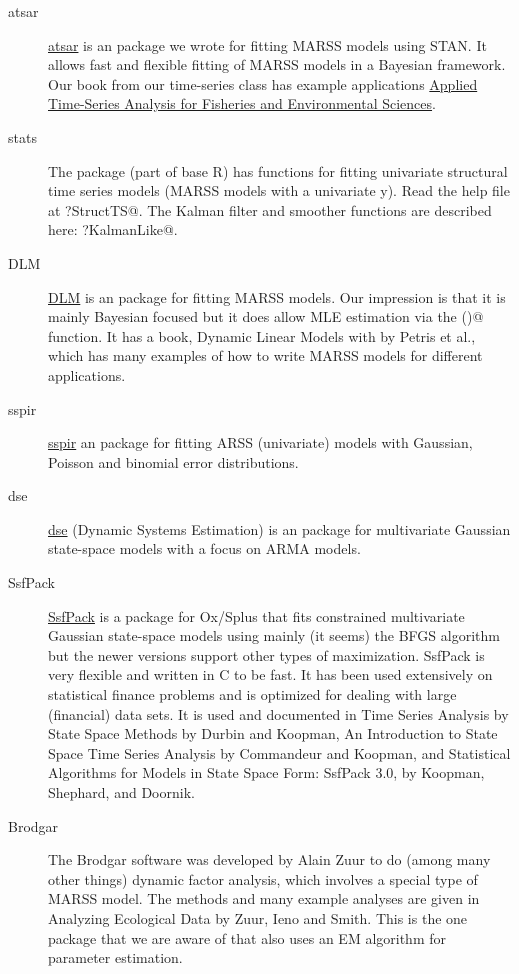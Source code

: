 \begin{description}
	\item[atsar] \href{https://nwfsc-timeseries.github.io/atsar/}{atsar} is an \R package we wrote for fitting MARSS models using STAN.  It allows fast and flexible fitting of MARSS models in a Bayesian framework.  Our book from our time-series class has example applications \href{https://nwfsc-timeseries.github.io/atsa-labs/}{Applied Time-Series Analysis for Fisheries and Environmental Sciences}.
  \item[stats] The \verb@stats@ package (part of base R) has functions for fitting univariate structural time series models (MARSS models with a univariate y).  Read the help file at \verb@?StructTS@. The Kalman filter and smoother functions are described here: \verb@?KalmanLike@.
	\item[DLM] \href{https://cran.r-project.org/package=dlm}{DLM} is an \R package for fitting MARSS models.  Our impression is that it is mainly Bayesian focused but it does allow MLE estimation via the \verb@optim()@ function.  It has a book, Dynamic Linear Models with \R  by Petris et al., which has many examples of how to write MARSS models for different applications.
	\item[sspir] \href{https://cran.r-project.org/package=sspir}{sspir} an \R package for fitting ARSS (univariate) models with Gaussian, Poisson and binomial error distributions.  
	\item[dse] \href{https://cran.r-project.org/package=dse}{dse} (Dynamic Systems Estimation) is an \R package for multivariate Gaussian state-space models with a focus on ARMA models.
	\item[SsfPack] \href{http://www.ssfpack.com/}{SsfPack} is a package for Ox/Splus that fits constrained multivariate Gaussian state-space models using mainly (it seems) the BFGS algorithm but the newer versions support other types of maximization.  SsfPack is very flexible and written in C to be fast.  It has been used extensively on statistical finance problems and is optimized for dealing with large (financial) data sets.  It is used and documented in Time Series Analysis by State Space Methods by Durbin and Koopman, An Introduction to State Space Time Series Analysis by Commandeur and Koopman, and Statistical Algorithms for Models in State Space Form: SsfPack 3.0, by Koopman, Shephard, and Doornik.
	\item[Brodgar] The Brodgar software was developed by Alain Zuur to do (among many other things) dynamic factor analysis, which involves a special type of MARSS model.  The methods and many example analyses are given in Analyzing Ecological Data by Zuur, Ieno and Smith.  This is the one package that we are aware of that also uses an EM algorithm for parameter estimation.

\end{description}
